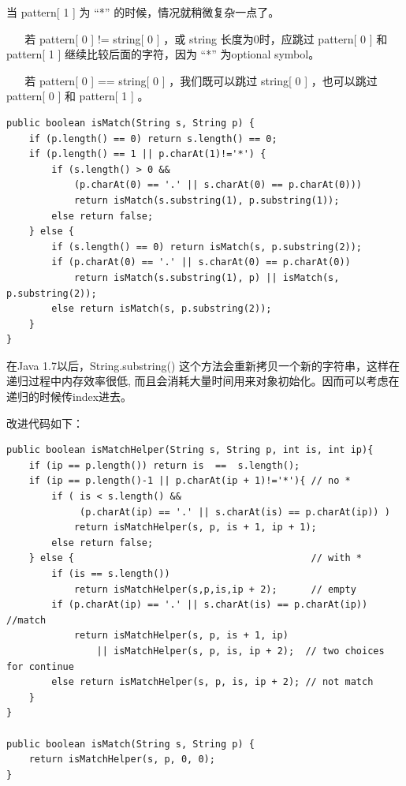 \documentclass[12pt]{book}
\begin{document}
\begin{enumerate}
当 pattern[ 1 ] 为 “*” 的时候，情况就稍微复杂一点了。

~ ~ 若 pattern[ 0 ] != string[ 0 ] ，或 string 长度为0时，应跳过 pattern[ 0 ] 和 pattern[ 1 ] 继续比较后面的字符，因为 “*” 为optional symbol。

~ ~ 若 pattern[ 0 ] == string[ 0 ] ，我们既可以跳过 string[ 0 ] ，也可以跳过 pattern[ 0 ] 和 pattern[ 1 ]  。

\lstset{language=java,label= ,caption= ,numbers=none}
\begin{lstlisting}
public boolean isMatch(String s, String p) {
    if (p.length() == 0) return s.length() == 0;
    if (p.length() == 1 || p.charAt(1)!='*') {
        if (s.length() > 0 &&
            (p.charAt(0) == '.' || s.charAt(0) == p.charAt(0)))
            return isMatch(s.substring(1), p.substring(1));
        else return false;
    } else {
        if (s.length() == 0) return isMatch(s, p.substring(2));
        if (p.charAt(0) == '.' || s.charAt(0) == p.charAt(0)) 
            return isMatch(s.substring(1), p) || isMatch(s, p.substring(2));
        else return isMatch(s, p.substring(2));
    }
}
\end{lstlisting}

在Java 1.7以后，String.substring() 这个方法会重新拷贝一个新的字符串，这样在递归过程中内存效率很低, 而且会消耗大量时间用来对象初始化。因而可以考虑在递归的时候传index进去。

改进代码如下：
\lstset{language=java,label= ,caption= ,numbers=none}
\begin{lstlisting}
public boolean isMatchHelper(String s, String p, int is, int ip){
    if (ip == p.length()) return is  ==  s.length();
    if (ip == p.length()-1 || p.charAt(ip + 1)!='*'){ // no *
        if ( is < s.length() &&
             (p.charAt(ip) == '.' || s.charAt(is) == p.charAt(ip)) ) 
            return isMatchHelper(s, p, is + 1, ip + 1); 
        else return false;
    } else {                                          // with *
        if (is == s.length())
            return isMatchHelper(s,p,is,ip + 2);      // empty
        if (p.charAt(ip) == '.' || s.charAt(is) == p.charAt(ip)) //match
            return isMatchHelper(s, p, is + 1, ip)
                || isMatchHelper(s, p, is, ip + 2);  // two choices for continue
        else return isMatchHelper(s, p, is, ip + 2); // not match
    }
}

public boolean isMatch(String s, String p) {
    return isMatchHelper(s, p, 0, 0);
}
\end{lstlisting}


\end{enumerate}
\end{document}
